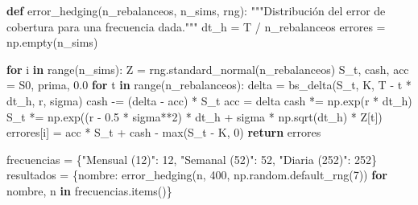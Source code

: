 \documentclass[
  spanish,
  letterpaper,
  DIV=11,
  numbers=noendperiod]{scrreprt}
\newenvironment{Shaded}{\begin{snugshade}}{\end{snugshade}}
\newcommand{\BuiltInTok}[1]{\textcolor[rgb]{0.00,0.23,0.31}{#1}}
\newcommand{\CommentTok}[1]{\textcolor[rgb]{0.37,0.37,0.37}{#1}}
\newcommand{\ControlFlowTok}[1]{\textcolor[rgb]{0.00,0.23,0.31}{\textbf{#1}}}
\newcommand{\DecValTok}[1]{\textcolor[rgb]{0.68,0.00,0.00}{#1}}
\newcommand{\FloatTok}[1]{\textcolor[rgb]{0.68,0.00,0.00}{#1}}
\newcommand{\KeywordTok}[1]{\textcolor[rgb]{0.00,0.23,0.31}{\textbf{#1}}}
\newcommand{\NormalTok}[1]{\textcolor[rgb]{0.00,0.23,0.31}{#1}}
\newcommand{\OperatorTok}[1]{\textcolor[rgb]{0.37,0.37,0.37}{#1}}
\newcommand{\StringTok}[1]{\textcolor[rgb]{0.13,0.47,0.30}{#1}}
\begin{document}
\begin{Shaded}
\begin{Highlighting}[]
\KeywordTok{def}\NormalTok{ error\_hedging(n\_rebalanceos, n\_sims, rng):}
    \CommentTok{"""Distribución del error de cobertura para una frecuencia dada."""}
\NormalTok{    dt\_h }\OperatorTok{=}\NormalTok{ T }\OperatorTok{/}\NormalTok{ n\_rebalanceos}
\NormalTok{    errores }\OperatorTok{=}\NormalTok{ np.empty(n\_sims)}

    \ControlFlowTok{for}\NormalTok{ i }\KeywordTok{in} \BuiltInTok{range}\NormalTok{(n\_sims):}
\NormalTok{        Z }\OperatorTok{=}\NormalTok{ rng.standard\_normal(n\_rebalanceos)}
\NormalTok{        S\_t, cash, acc }\OperatorTok{=}\NormalTok{ S0, prima, }\FloatTok{0.0}
        \ControlFlowTok{for}\NormalTok{ t }\KeywordTok{in} \BuiltInTok{range}\NormalTok{(n\_rebalanceos):}
\NormalTok{            delta }\OperatorTok{=}\NormalTok{ bs\_delta(S\_t, K, T }\OperatorTok{{-}}\NormalTok{ t }\OperatorTok{*}\NormalTok{ dt\_h, r, sigma)}
\NormalTok{            cash }\OperatorTok{{-}=}\NormalTok{ (delta }\OperatorTok{{-}}\NormalTok{ acc) }\OperatorTok{*}\NormalTok{ S\_t}
\NormalTok{            acc }\OperatorTok{=}\NormalTok{ delta}
\NormalTok{            cash }\OperatorTok{*=}\NormalTok{ np.exp(r }\OperatorTok{*}\NormalTok{ dt\_h)}
\NormalTok{            S\_t }\OperatorTok{*=}\NormalTok{ np.exp((r }\OperatorTok{{-}} \FloatTok{0.5} \OperatorTok{*}\NormalTok{ sigma}\OperatorTok{**}\DecValTok{2}\NormalTok{) }\OperatorTok{*}\NormalTok{ dt\_h }\OperatorTok{+}\NormalTok{ sigma }\OperatorTok{*}\NormalTok{ np.sqrt(dt\_h) }\OperatorTok{*}\NormalTok{ Z[t])}
\NormalTok{        errores[i] }\OperatorTok{=}\NormalTok{ acc }\OperatorTok{*}\NormalTok{ S\_t }\OperatorTok{+}\NormalTok{ cash }\OperatorTok{{-}} \BuiltInTok{max}\NormalTok{(S\_t }\OperatorTok{{-}}\NormalTok{ K, }\DecValTok{0}\NormalTok{)}
    \ControlFlowTok{return}\NormalTok{ errores}

\NormalTok{frecuencias }\OperatorTok{=}\NormalTok{ \{}\StringTok{"Mensual (12)"}\NormalTok{: }\DecValTok{12}\NormalTok{, }\StringTok{"Semanal (52)"}\NormalTok{: }\DecValTok{52}\NormalTok{, }\StringTok{"Diaria (252)"}\NormalTok{: }\DecValTok{252}\NormalTok{\}}
\NormalTok{resultados }\OperatorTok{=}\NormalTok{ \{nombre: error\_hedging(n, }\DecValTok{400}\NormalTok{, np.random.default\_rng(}\DecValTok{7}\NormalTok{))}
              \ControlFlowTok{for}\NormalTok{ nombre, n }\KeywordTok{in}\NormalTok{ frecuencias.items()\}}


\end{Highlighting}
\end{Shaded}
\end{document}
